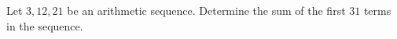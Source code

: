 Let $3,12,21$ be an arithmetic sequence. Determine the sum of the first $31$ terms in the sequence.\\